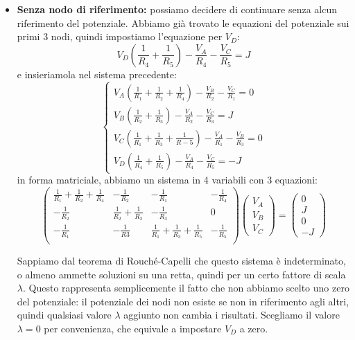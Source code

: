 \documentclass[a4paper,11pt]{article}
\begin{document}
\begin{itemize}
\item \textbf{Senza nodo di riferimento:} possiamo decidere di continuare senza alcun riferimento del potenziale.
	Abbiamo già trovato le equazioni del potenziale sui primi 3 nodi, quindi impostiamo l'equazione per $V_D$:
	$$ V_D \left( \frac{1}{R_4} + \frac{1}{R_5} \right) - \frac{V_A}{R_4} - \frac{V_C}{R_5} = J $$
	e insieriamola nel sistema precedente:
	\[
		\begin{cases}
		 V_A\left( \frac{1}{R_1} + \frac{1}{R_2} + \frac{1}{R_4} \right) - \frac{V_B}{R_2} - \frac{V_C}{R_1} = 0 \\ 
		 V_B \left( \frac{1}{R_2} + \frac{1}{R_3} \right) - \frac{V_A}{R_2} - \frac{V_C}{R_3} = J \\
		 V_C \left( \frac{1}{R_1} + \frac{1}{R_3} + \frac{1}{R-5} \right) - \frac{V_A}{R_1} - \frac{V_B}{R_3} = 0 \\
			V_D \left( \frac{1}{R_4} + \frac{1}{R_5} \right) - \frac{V_A}{R_4} - \frac{V_C}{R_5} = -J
		\end{cases}
	\]
	in forma matriciale, abbiamo un sistema in 4 variabili con 3 equazioni:
$$
\begin{pmatrix}
	\frac{1}{R_1} + \frac{1}{R_2} + \frac{1}{R_4} & -\frac{1}{R_2} & -\frac{1}{R_1} & -\frac{1}{R_4} \\
	-\frac{1}{R_2} & \frac{1}{R_2} + \frac{1}{R_3} & -\frac{1}{R_3} & 0 \\
	-\frac{1}{R_1} & -\frac{1}{R3} & \frac{1}{R_1} + \frac{1}{R_3} + \frac{1}{R_5} & -\frac{1}{R_5} \\ 
\end{pmatrix}
\begin{pmatrix}
V_A \\ V_B \\ V_C
\end{pmatrix}
=
\begin{pmatrix}
0 \\ J \\ 0 \\ -J 
\end{pmatrix}
$$

Sappiamo dal teorema di Rouché-Capelli che questo sistema è indeterminato, o almeno ammette soluzioni su una retta, quindi per un certo fattore di scala $\lambda$.
Questo rappresenta semplicemente il fatto che non abbiamo scelto uno zero del potenziale: il potenziale dei nodi non esiste se non in riferimento agli altri, quindi qualsiasi valore $\lambda$ aggiunto non cambia i risultati.
Scegliamo il valore $\lambda = 0$ per convenienza, che equivale a impostare $V_D$ a zero.
\end{itemize}
\end{document}
